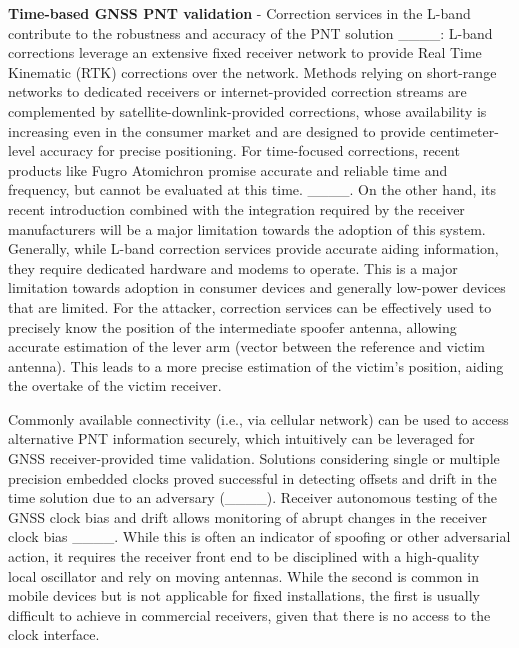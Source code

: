\textbf{Time-based GNSS PNT validation} - Correction services in the L-band contribute to the robustness and accuracy of the PNT solution ____: L-band corrections leverage an extensive fixed receiver network to provide Real Time Kinematic (RTK) corrections over the network. Methods relying on short-range networks to dedicated receivers or internet-provided correction streams are complemented by satellite-downlink-provided corrections, whose availability is increasing even in the consumer market and are designed to provide centimeter-level accuracy for precise positioning. For time-focused corrections, recent products like Fugro Atomichron promise accurate and reliable time and frequency, but cannot be evaluated at this time. ____. On the other hand, its recent introduction combined with the integration required by the receiver manufacturers will be a major limitation towards the adoption of this system. Generally, while L-band correction services provide accurate aiding information, they require dedicated hardware and modems to operate. This is a major limitation towards adoption in consumer devices and generally low-power devices that are limited. For the attacker, correction services can be effectively used to precisely know the position of the intermediate spoofer antenna, allowing accurate estimation of the lever arm (vector between the reference and victim antenna). This leads to a more precise estimation of the victim's position, aiding the overtake of the victim receiver.

Commonly available connectivity (i.e., via cellular network) can be used to access alternative PNT information securely, which intuitively can be leveraged for GNSS receiver-provided time validation. Solutions considering single or multiple precision embedded clocks proved successful in detecting offsets and drift in the time solution due to an adversary (____). Receiver autonomous testing of the GNSS clock bias and drift allows monitoring of abrupt changes in the receiver clock bias ____. While this is often an indicator of spoofing or other adversarial action, it requires the receiver front end to be disciplined with a high-quality local oscillator and rely on moving antennas. While the second is common in mobile devices but is not applicable for fixed installations, the first is usually difficult to achieve in commercial receivers, given that there is no access to the clock interface.

